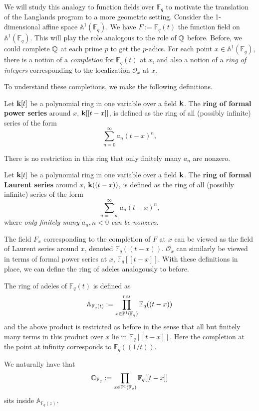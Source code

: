 We will study this analogy to function fields over $\mathbb F_q$ to motivate the translation of the Langlands program to a more geometric setting. Consider the 1-dimensional affine space $\mathbb A^1 (\mathbb F_q)$. We have $F := \mathbb F_q(t)$ the function field on $\mathbb A^1 (\mathbb F_q)$. This will play the role analogous to the role of $\mathbb{Q}$ before. Before, we could complete $\mathbb{Q}$ at each prime $p$ to get the $p$-adics. For each point $x \in \mathbb A^1 (\mathbb F_q)$, there is a notion of a \emph{completion} for $\mathbb F_q(t)$ at $x$, and also a notion of a \emph{ring of integers} corresponding to the localization $\mathcal O_x$ at $x$.

To understand these completions, we make the following definitions.
\begin{defn}
	Let $\mathbf{k}[t]$ be a polynomial ring in one variable over a field $\mathbf{k}$. The \textbf{ring of formal power series} around $x$, $\mathbf{k}[[t-x]]$, is defined as the ring of all (possibly infinite) series of the form
	\[
		\sum_{n=0}^\infty a_n (t-x)^n,
	\]
\end{defn}
\begin{nb}
	There is no restriction in this ring that only finitely many $a_n$ are nonzero. 
\end{nb}

\begin{defn}
	Let $\mathbf{k}[t]$ be a polynomial ring in one variable over a field $\mathbf{k}$. The \textbf{ring of formal Laurent series} around $x$, $\mathbf{k}((t-x))$, is defined as the ring of all (possibly infinite) series of the form
	\[
		\sum_{n=-\infty}^\infty a_n (t-x)^n,
	\]
	where \emph{only finitely many $a_n, n<0$ can be nonzero}.
\end{defn}

The field $F_x$ corresponding to the completion of $F$ at $x$ can be viewed as the field of Laurent series around $x$, denoted $\mathbb F_q((t-x))$. $\mathcal O_x$ can similarly be viewed in terms of formal power series at $x$, $\mathbb F_q [[t-x]]$. With these definitions in place, we can define the ring of adeles analogously to before.

\begin{defn}
	The ring of adeles of $\mathbb F_q(t)$ is defined as 
	\[
		\mathbb A_{\mathbb{F}_q(t)} := \prod_{x \in \mathbb P^1(\mathbb{F}_q)}^{res} \mathbb{F}_q((t-x))
	\]
	and the above product is restricted as before in the sense that all but finitely many terms in this product over $x$ lie in $\mathbb F_q [[t-x]]$. Here the completion at the point at infinity corresponds to $\mathbb F_q ((1/t))$.
\end{defn}
We naturally have that 
\[
	\mathbb O_{\mathbb{F}_q} := 	\prod_{x \in \mathbb P^1(\mathbb{F}_q)} \mathbb{F}_q[[t-x]]
\]
sits inside $\mathbb A_{\mathbb F_q(z)}$.

